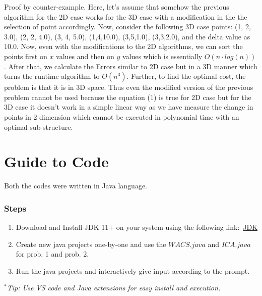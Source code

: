 \documentclass{article}
\begin{document}
Proof by counter-example. Here, let's assume that somehow the previous algorithm for the 2D case works for the 3D case with a modification in the the selection of point accordingly. Now, consider the following 3D case points: (1, 2, 3.0), (2, 2, 4.0), (3, 4, 5.0), (1,4,10.0), (3,5,1.0), (3,3,2.0), and the delta value as $10.0$. Now, even with the modifications to the 2D algorithms, we can sort the points first on $x$ values and then on $y$ values which is essentially $O(n\cdot log(n))$. After that, we calculate the Errors similar to 2D case but in a 3D manner which turns the runtime algorithm to $O(n^3)$. Further, to find the optimal cost, the problem is that it is in 3D space. Thus even the modified version of the previous problem cannot be used because the equation (1) is true for 2D case but for the 3D case it doesn't work in a simple linear way as we have measure the change in points in 2 dimension which cannot be executed in polynomial time with an optimal sub-structure.
\section*{Guide to Code}
Both the codes were written in Java language. 
\subsubsection*{Steps}
\begin{enumerate}
    \item Download and Install JDK 11+ on your system using the following link:~\href{https://www.oracle.com/java/technologies/downloads/}{JDK}
    \item Create new java projects one-by-one and use the $WACS.java$ and $ICA.java$ for prob. 1 and prob. 2.
    \item Run the java projects and interactively give input according to the prompt.
\end{enumerate}
\textit{$^*$Tip: Use VS code and Java extensions for easy install and execution.}\\
\markright{}


\end{document}
